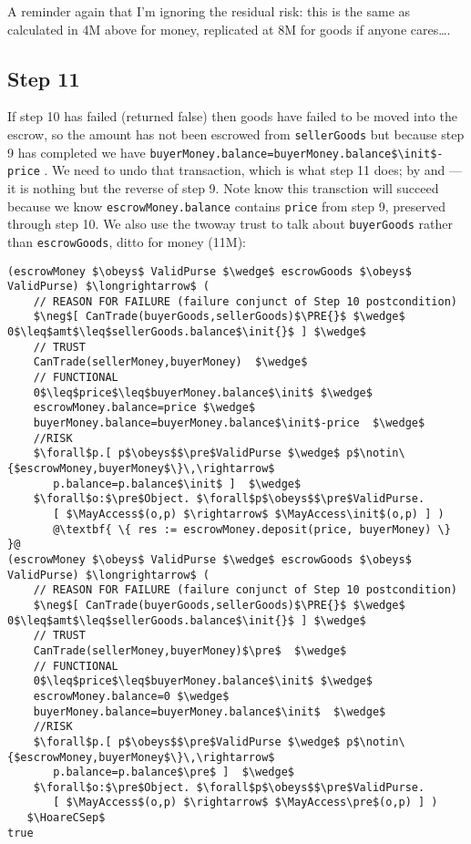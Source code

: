 A reminder again that I'm ignoring the residual risk: this is the same as calculated in 4M above for money,
replicated at 8M for goods if anyone cares\ldots.

\subsection{Step 11}

If step 10 has failed (returned false) then goods have failed to be moved into the escrow,
so the amount has not been escrowed from \lstinline+sellerGoods+ but
because step 9 has completed we have
%
\lstinline+buyerMoney.balance=buyerMoney.balance$\init$-price+
%
. We need to undo that transaction, which is what step 11 does;
by  and  --- it is nothing but the reverse of step 9.
Note know this transction will succeed because we know \lstinline+escrowMoney.balance+ contains \lstinline+price+
from step 9, preserved through step 10.   We also use the twoway trust to talk about \lstinline+buyerGoods+ rather than
\lstinline+escrowGoods+, ditto for money (11M):

\begin{lstlisting}[escapechar=@]
(escrowMoney $\obeys$ ValidPurse $\wedge$ escrowGoods $\obeys$ ValidPurse) $\longrightarrow$ (
    // REASON FOR FAILURE (failure conjunct of Step 10 postcondition)
    $\neg$[ CanTrade(buyerGoods,sellerGoods)$\PRE{}$ $\wedge$ 0$\leq$amt$\leq$sellerGoods.balance$\init{}$ ] $\wedge$
    // TRUST
    CanTrade(sellerMoney,buyerMoney)  $\wedge$
    // FUNCTIONAL
    0$\leq$price$\leq$buyerMoney.balance$\init$ $\wedge$
    escrowMoney.balance=price $\wedge$
    buyerMoney.balance=buyerMoney.balance$\init$-price  $\wedge$
    //RISK
    $\forall$p.[ p$\obeys$$\pre$ValidPurse $\wedge$ p$\notin\{$escrowMoney,buyerMoney$\}\,\rightarrow$
       p.balance=p.balance$\init$ ]  $\wedge$
    $\forall$o:$\pre$Object. $\forall$p$\obeys$$\pre$ValidPurse.
       [ $\MayAccess$(o,p) $\rightarrow$ $\MayAccess\init$(o,p) ] )
       @\textbf{ \{ res := escrowMoney.deposit(price, buyerMoney) \} }@
(escrowMoney $\obeys$ ValidPurse $\wedge$ escrowGoods $\obeys$ ValidPurse) $\longrightarrow$ (
    // REASON FOR FAILURE (failure conjunct of Step 10 postcondition)
    $\neg$[ CanTrade(buyerGoods,sellerGoods)$\PRE{}$ $\wedge$ 0$\leq$amt$\leq$sellerGoods.balance$\init{}$ ] $\wedge$
    // TRUST
    CanTrade(sellerMoney,buyerMoney)$\pre$  $\wedge$
    // FUNCTIONAL
    0$\leq$price$\leq$buyerMoney.balance$\init$ $\wedge$
    escrowMoney.balance=0 $\wedge$
    buyerMoney.balance=buyerMoney.balance$\init$  $\wedge$
    //RISK
    $\forall$p.[ p$\obeys$$\pre$ValidPurse $\wedge$ p$\notin\{$escrowMoney,buyerMoney$\}\,\rightarrow$
       p.balance=p.balance$\pre$ ]  $\wedge$
    $\forall$o:$\pre$Object. $\forall$p$\obeys$$\pre$ValidPurse.
       [ $\MayAccess$(o,p) $\rightarrow$ $\MayAccess\pre$(o,p) ] )
   $\HoareCSep$
true
\end{lstlisting}

